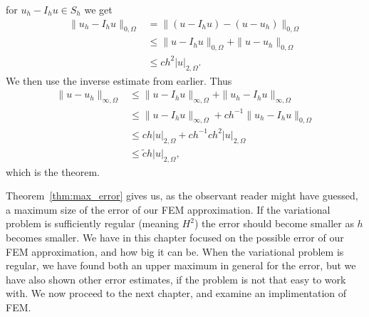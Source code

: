 \begin{bev}
    for $u_h-I_h u\in S_h$
    we get
    \begin{align*}
        \|u_h-I_h u\|_{0,\Omega} &= \| (u-I_h u)-(u-u_h)\|_{0,\Omega} \\
        & \leq \| u-I_h u\|_{0,\Omega}+\|u-u_h\|_{0,\Omega} \\
        &\leq ch^2|u|_{2,\Omega}.
    \end{align*}
    We then use the inverse estimate from earlier. Thus 
    \begin{align}
        \|u-u_h\|_{\infty,\Omega} &\leq \|u-I_h u\|_{\infty,\Omega} + \|u_h-I_h u\|_{\infty,\Omega} \\
        &\leq \|u-I_h u\|_{\infty,\Omega} + ch^{-1} \|u_h-I_h u\|_{0,\Omega} \\
        &\leq ch|u|_{2,\Omega} + ch^{-1} ch^2|u|_{2,\Omega}\\ 
        &\leq \tilde{c}h|u|_{2,\Omega},
    \end{align}
    which is the theorem.    
\end{bev}
Theorem~\ref{thm:max_error} gives us, as the observant reader might have guessed, 
a maximum size of the error of our FEM approximation.
If the variational problem is sufficiently regular (meaning $H^2$)
the error should
become smaller as $h$ becomes smaller. 
We have in this chapter focused on the possible error of our FEM approximation, 
and how big it can be. 
When the variational problem is regular, we have found both an upper maximum 
in general for the error, but we have also shown other error estimates, 
if the problem is not that easy to work with.
We now proceed to the next chapter, and examine an implimentation of 
FEM.